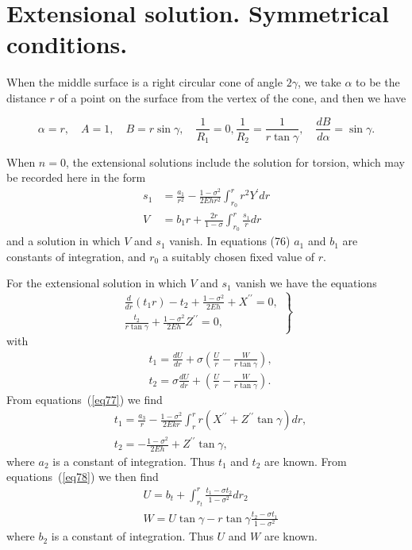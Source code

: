 \setcounter{equation}{75}
\section{Extensional solution. Symmetrical conditions.}\label{article346}

When the middle surface is a right circular cone of angle \(2 \gamma \),
we take \(\alpha \) to be the distance \(r\) of a point on the surface
from the vertex of the cone, and then we have

\[\alpha = r, \quad A=1, \quad B=r \sin \gamma, \quad \frac{1}{R_1}=0,
\frac{1}{R_2}=\frac{1}{r \tan \gamma}, \quad \frac{d B}{d \alpha}=\sin \gamma.\]

When \(n=0\), the extensional solutions include the solution for
torsion, which may be recorded here in the form
\begin{align}
s_1&=\frac{a_1}{r^2}-\frac{1-\sigma^2}{2 E h r^2} \int_{r_0}^r r^2 Y^{\prime} d r\\
V&=b_1 r+\frac{2 r}{1-\sigma} \int_{r_0}^r \frac{s_1}{r} d r \nonumber \label{eq76}
\end{align}
and a solution in which \(V\) and \(s_1\) vanish. In equations
(76) \(a_1\) and \(b_1\) are constants of integration, and \(r_0\) a
suitably chosen fixed value of \(r\).

For the extensional solution in which \(V\) and \(s_1\) vanish we have
the equations
\begin{equation}
\left.\begin{array}{r}
\frac{d}{d r}\left(t_1 r\right)-t_2+\frac{1-\sigma^2}{2 E h}+X^{\prime \prime}=0,\\
\frac{t_2}{r \tan \gamma}+\frac{1-\sigma^2}{2 E h} Z^{\prime \prime}=0,\label{eq77}
\end{array}\right\}
\end{equation}
with
\begin{align}
& t_1=\frac{d U}{d r}+\sigma\left(\frac{U}{r}-\frac{W}{r \tan \gamma}\right), \nonumber \\
& t_2=\sigma \frac{d U}{d r}+\left(\frac{U}{r}-\frac{W}{r \tan \gamma}\right).\label{eq78}
\end{align}
From equations~(\ref{eq77}) we find %
\begin{align}
& t_1=\frac{a_3}{r}-\frac{1-\sigma^2}{2 E k r} \int_r^r r
\left(X^{\prime \prime}+ Z^{\prime \prime} \tan \gamma \right) d r, \nonumber \\
& t_2=-\frac{1-\sigma^2}{2 E h}+Z^{\prime \prime} \tan \gamma, \label{eq79}
\end{align}
where \(a_2\) is a constant of integration. Thus \(t_1\) and \(t_2\) are
known.  From equations~(\ref{eq78}) we then find  %
\begin{align}
& U=b_t+\int_{r_t}^r \frac{t_1-\sigma t_2}{1-\sigma^2} d r_2 \nonumber \\
& W=U \tan \gamma-r \tan \gamma \frac{t_2-\sigma t_1}{1-\sigma^2} \label{eq80}
\end{align}
where \(b_2\) is a constant of integration. Thus \(U\) and \(W\) are known.
